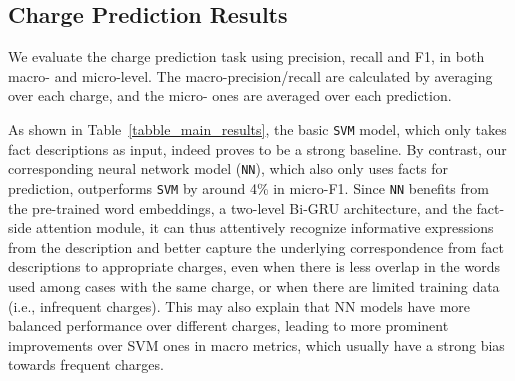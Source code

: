 

\subsection{Charge Prediction Results}
\label{sec_main_results}
We evaluate the charge prediction task using precision, recall and F1, in both macro- and micro-level.
The macro-precision/recall are calculated by averaging over %
each charge, and the micro- ones are averaged  over each prediction. %



As shown in Table~\ref{tabble_main_results}, %
the basic \texttt{SVM} model,
which only takes fact descriptions as input, indeed proves to be a strong baseline.
By contrast, our corresponding neural network model (\texttt{NN}), which also only uses facts for prediction, outperforms \texttt{SVM} 
by around 4\% in micro-F1.
Since \texttt{NN} benefits from the pre-trained word embeddings,
a two-level Bi-GRU architecture, and the fact-side attention module,
it can thus attentively recognize informative expressions from the description and 
better capture the underlying correspondence from fact descriptions to appropriate charges,
even when there is less overlap in the words used among cases with the same charge,
or when there are limited training data (i.e., infrequent charges). This may also explain that NN models 
have more balanced performance over different charges, leading to more prominent improvements over 
SVM ones in macro metrics, which usually have a strong bias towards frequent charges.
%

